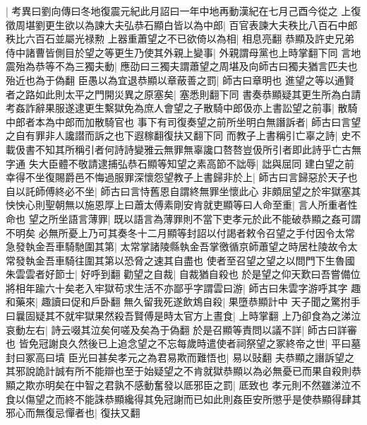 |{
	考異曰劉向傳曰冬地復震元紀此月詔曰一年中地再動漢紀在七月己酉今從之}
上復徵周堪劉更生欲以為諫大夫弘恭石顯白皆以為中郎|{
	百官表諫大夫秩比八百石中郎秩比六百石並屬光禄勲}
上器重蕭望之不已欲倚以為相|{
	相息亮翻}
恭顯及許史兄弟侍中諸曹皆側目於望之等更生乃使其外親上變事|{
	外親謂母黨也上時掌翻下同}
言地震殆為恭等不為三獨夫動|{
	應劭曰三獨夫謂蕭望之周堪及向師古曰獨夫猶言匹夫也殆近也為于偽翻}
臣愚以為宜退恭顯以章蔽善之罰|{
	師古曰章明也}
進望之等以通賢者之路如此則太平之門開災異之原塞矣|{
	塞悉則翻下同}
書奏恭顯疑其更生所為白請考姦詐辭果服遂逮更生繫獄免為庶人會望之子散騎中郎伋亦上書訟望之前事|{
	散騎中郎者本為中郎而加散騎官也}
事下有司復奏望之前所坐明白無譖訴者|{
	師古曰言望之自有罪非人讒譛而訴之也下遐稼翻復扶又翻下同}
而教子上書稱引亡辜之詩|{
	史不載伋書不知其所稱引者何詩詩變雅云無罪無辜讒口嗸嗸豈伋所引者即此詩乎亡古無字通}
失大臣體不敬請逮捕弘恭石顯等知望之素高節不詘辱|{
	詘與屈同}
建白望之前幸得不坐復賜爵邑不悔過服罪深懷怨望教子上書歸非於上|{
	師古曰言歸惡於天子也}
自以託師傅終必不坐|{
	師古曰言恃舊恩自謂終無罪坐懷此心}
非頗屈望之於牢獄塞其怏怏心則聖朝無以施恩厚上曰蕭太傅素剛安肯就吏顯等曰人命至重|{
	言人所重者性命也}
望之所坐語言薄罪|{
	既以語言為薄罪則不當下吏孝元於此不能破恭顯之姦可謂不明矣}
必無所憂上乃可其奏冬十二月顯等封詔以付謁者敕令召望之手付因令太常急發執金吾車騎馳圍其第|{
	太常掌諸陵縣執金吾掌徼循京師蕭望之時居杜陵故令太常發執金吾車騎往圍其第以恐脅之速其自盡也}
使者至召望之望之以問門下生魯國朱雲雲者好節士|{
	好呼到翻}
勸望之自裁|{
	自裁猶自殺也}
於是望之仰天歎曰吾嘗備位將相年踰六十矣老入牢獄苟求生活不亦鄙乎字謂雲曰游|{
	師古曰朱雲字游呼其字}
趣和藥來|{
	趣讀曰促和戶卧翻}
無久留我死遂飲鴆自殺|{
	果墮恭顯計中}
天子聞之驚拊手曰曩固疑其不就牢獄果然殺吾賢傅是時太官方上晝食|{
	上時掌翻}
上乃卻食為之涕泣哀動左右|{
	詩云啜其泣矣何嗟及矣為于偽翻}
於是召顯等責問以議不詳|{
	師古曰詳審也}
皆免冠謝良久然後已上追念望之不忘每歲時遣使者祠祭望之冢終帝之世|{
	平曰墓封曰冢高曰墳}
臣光曰甚矣孝元之為君易欺而難悟也|{
	易以䜴翻}
夫恭顯之譖訴望之其邪說詭計誠有所不能辯也至于始疑望之不肯就獄恭顯以為必無憂已而果自殺則恭顯之欺亦明矣在中智之君孰不感動奮發以厎邪臣之罰|{
	厎致也}
孝元則不然雖涕泣不食以傷望之而終不能誅恭顯纔得其免冠謝而已如此則姦臣安所懲乎是使恭顯得肆其邪心而無復忌憚者也|{
	復扶又翻}


